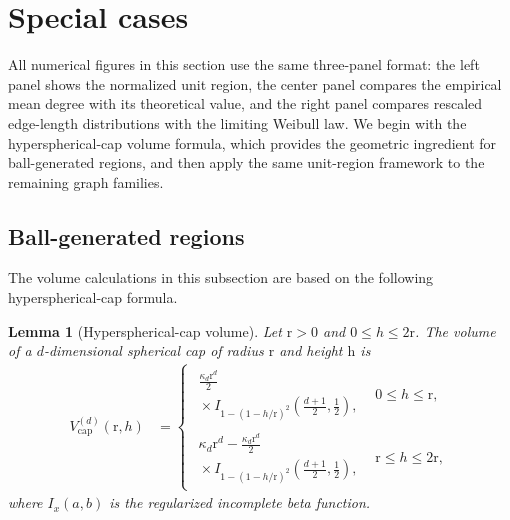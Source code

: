 \documentclass[a4paper,fleqn]{cas-dc}
\numberwithin{equation}{section}
\newcommand{\1}{\mathds{1}}
\newcommand{\0}{\mathbf{0}}
\newtheorem{lemma}[theorem]{Lemma}
\begin{document}
\section{Special cases}\label{sec:examples}

All numerical figures in this section use the same three-panel format:
the left panel shows the normalized unit region, the center panel compares
the empirical mean degree with its theoretical value, and the right panel
compares rescaled edge-length distributions with the limiting Weibull law.
We begin with the hyperspherical-cap volume formula, which provides the
geometric ingredient for ball-generated regions, and then apply the same
unit-region framework to the remaining graph families.

\subsection{Ball-generated regions}
The volume calculations in this subsection are based on the following hyperspherical-cap formula.

\begin{lemma}[Hyperspherical-cap volume]
\label{lem:li-cap-volume}
Let $\mathrm{r}>0$ and $0 \leq h \leq 2\mathrm{r}$. The volume of a $d$-dimensional spherical cap of radius $\mathrm{r}$ and height $\mathrm{h}$ is
\begin{equation}\label{eq:li-cap-volume}
\begin{aligned}
V_{\mathrm{cap}}^{(d)}(\mathrm{r},h) &=
\begin{cases}
\begin{gathered}
\displaystyle \frac{\kappa_d\mathrm{r}^d}{2}\\[-1pt]
\displaystyle {}\times I_{1-(1-h/\mathrm{r})^2}
\left(\frac{d+1}{2},\frac{1}{2}\right),
\end{gathered}
& 0 \leq h \leq \mathrm{r}, \\[1.2em]
\begin{gathered}
\displaystyle \kappa_d\mathrm{r}^d
- \frac{\kappa_d\mathrm{r}^d}{2}\\[-1pt]
\displaystyle {}\times I_{1-(1-h/\mathrm{r})^2}
\left(\frac{d+1}{2},\frac{1}{2}\right),
\end{gathered}
& \mathrm{r} \leq h \leq 2\mathrm{r},
\end{cases}
\end{aligned}
\end{equation}
where $I_x(a,b)$ is the regularized incomplete beta function.
\end{lemma}
\end{document}
